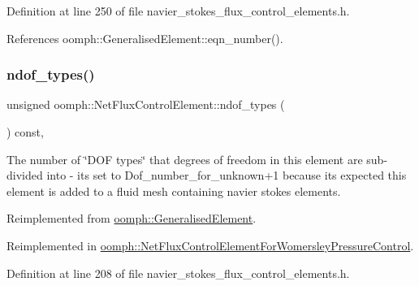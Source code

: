 Definition at line 250 of file navier\+\_\+stokes\+\_\+flux\+\_\+control\+\_\+elements.\+h.



References oomph\+::\+Generalised\+Element\+::eqn\+\_\+number().

\mbox{\label{classoomph_1_1NetFluxControlElement_a16809a8ad123ba41f826d9e920aba9e0}} 
\subsubsection{\texorpdfstring{ndof\+\_\+types()}{ndof\_types()}}
{\footnotesize\ttfamily unsigned oomph\+::\+Net\+Flux\+Control\+Element\+::ndof\+\_\+types (\begin{DoxyParamCaption}{ }\end{DoxyParamCaption}) const\hspace{0.3cm}{\ttfamily [inline]}, {\ttfamily [virtual]}}



The number of \char`\"{}\+D\+O\+F types\char`\"{} that degrees of freedom in this element are sub-\/divided into -\/ it\textquotesingle{}s set to Dof\+\_\+number\+\_\+for\+\_\+unknown+1 because it\textquotesingle{}s expected this element is added to a fluid mesh containing navier stokes elements. 



Reimplemented from \hyperlink{classoomph_1_1GeneralisedElement_a0c6037a870597b35dcf1c780710b9a56}{oomph\+::\+Generalised\+Element}.



Reimplemented in \hyperlink{classoomph_1_1NetFluxControlElementForWomersleyPressureControl_a538b22e5aceecf140d03e400a8848a33}{oomph\+::\+Net\+Flux\+Control\+Element\+For\+Womersley\+Pressure\+Control}.



Definition at line 208 of file navier\+\_\+stokes\+\_\+flux\+\_\+control\+\_\+elements.\+h.

\mbox{\label{classoomph_1_1NetFluxControlElement_ac19688739022d56b66e74c14fedb7c4a}} 
